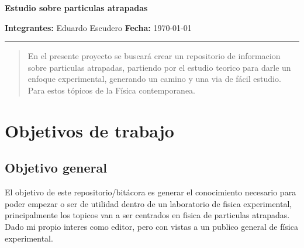 \documentclass{article}
\begin{document}
\begin{center}
\begin{huge}
\textbf{Estudio sobre particulas atrapadas}
\end{huge}
\vspace*{0.01cm}
\end{center}





\textbf{Integrantes:} Eduardo Escudero
\textbf{Fecha:} \today


\hspace{4cm}


\begin{center}
\rule{12cm}{0.1mm}
\end{center}















\begin{abstract}

En el presente proyecto se buscará crear un repositorio de informacion sobre particulas atrapadas, partiendo por el estudio teorico
para darle un enfoque experimental, generando un camino y una via de fácil estudio. Para estos tópicos de la Física contemporanea.

\end{abstract}




\section*{Objetivos de trabajo}


\subsection*{Objetivo general}

El objetivo de este repositorio/bitácora es generar el conocimiento necesario para poder empezar o ser de utilidad dentro de un laboratorio de 
fisica experimental, principalmente los topicos van a ser centrados en fisica de particulas atrapadas. Dado mi propio interes como editor, pero con 
vistas a un publico general de física experimental.
\end{document}
